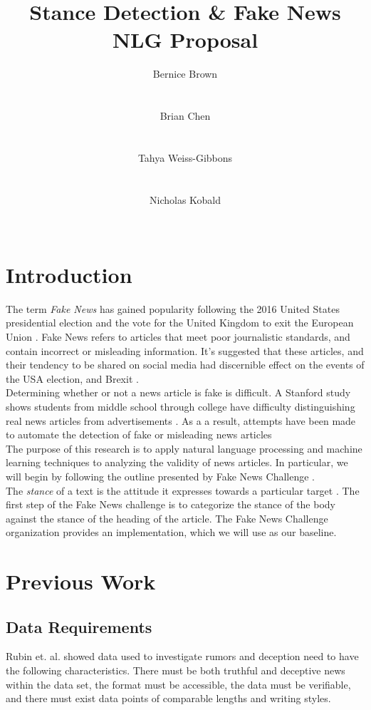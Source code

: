 \documentclass[11pt,a4paper]{article}
\title{Stance Detection \& Fake News \\ NLG Proposal}
\author{
  Bernice Brown \\
					  \\
					  \\\And
  Brian Chen 	      \\
					  \\
					  \\\And
  Tahya Weiss-Gibbons \\
					  \\
					  \\\And
  Nicholas Kobald \\  \\
}
\date{}
\begin{document}
\maketitle
\section{Introduction}
The term \emph{Fake News} has gained popularity following the 2016 United States presidential election and the vote for the United Kingdom to exit the European Union \cite{rose2017brexit}\cite{kucharski2016post}. Fake News refers to articles that meet poor journalistic standards, and contain incorrect or misleading information. It's suggested that these articles, and their tendency to be shared on social media had discernible effect on the events of the USA election, and Brexit \cite{allcott2017social}. \\


Determining whether or not a news article is fake is difficult.  A Stanford study shows students from middle school through college have difficulty distinguishing real news articles from advertisements \cite{wineburg2016evaluating}. As a a result, attempts have been made to automate the detection of fake or misleading news articles \cite{conroy2015automatic}\\

The purpose of this research is to apply natural language processing and machine learning techniques to analyzing the validity of news articles. In particular, we will begin by following the outline presented by Fake News Challenge \cite{fakenewschallenge}. \\

The \emph{stance} of a text is the attitude it expresses towards a particular target \cite{augenstein2016stance}. The first step of the Fake News challenge is to categorize the stance of the body against the stance of the heading of the article. The Fake News Challenge organization provides an implementation, which we will use as our baseline. 


\section{Previous Work}

\subsection{Data Requirements}
Rubin et. al. showed data used to investigate rumors and deception need to have the following characteristics. There must be both truthful and deceptive news within the data set, the format must be accessible, the data must be verifiable, and there must exist data points of comparable lengths and writing styles\cite{Rubin}. \\
\end{document}
